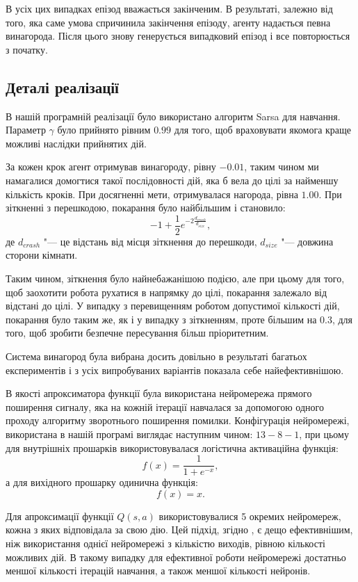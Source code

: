 \documentclass[a4paper,10pt,fleqn]{article}
\begin{document}
В усіх цих випадках епізод вважається закінченим. В результаті, залежно від того, яка саме умова спричинила закінчення епізоду, агенту надається певна винагорода. Після цього знову генерується випадковий епізод і все повторюється з початку.

\subsection{Деталі реалізації}

В нашій програмній реалізації було використано алгоритм Sarsa для навчання. Параметр $\gamma$ було прийнято рівним $0.99$ для того, щоб враховувати якомога краще можливі наслідки прийнятих дій.

За кожен крок агент отримував винагороду, рівну $-0.01$, таким чином ми намагалися домогтися такої послідовності дій, яка б вела до цілі за найменшу кількість кроків. При досягненні мети, отримувалася нагорода, рівна $1.00$. При зіткненні з перешкодою, покарання було найбільшим і становило:
\[
    -1+ \frac{1}{2} e^{-2\frac{d_{crash}}{d_{size}}},
\]
де $d_{crash}$ "--- це відстань від місця зіткнення до перешкоди, $d_{size}$ "--- довжина сторони кімнати.

Таким чином, зіткнення було найнебажанішою подією, але при цьому для того, щоб заохотити робота рухатися в напрямку до цілі, покарання залежало від відстані до цілі. У випадку з перевищенням роботом допустимої кількості дій, покарання було таким же, як і у випадку з зіткненням, проте більшим на $0.3$, для того, щоб зробити безпечне пересування більш пріоритетним.

Система винагород була вибрана досить довільно в результаті багатьох експериментів і з усіх випробуваних варіантів показала себе найефективнішою.

В якості апроксиматора функції була використана нейромережа прямого поширення сигналу, яка на кожній ітерації навчалася за допомогою одного проходу алгоритму зворотнього поширення помилки. Конфігурація нейромережі, використана в нашій програмі виглядає наступним чином: $13-8-1$, при цьому для внутрішніх прошарків використовувалася логістична активаційна функція:
\[
    f(x) = \frac{1}{1 + e^{-x}},
\]
а для вихідного прошарку одинична функція:
\[
    f(x) = x.
\]

Для апроксимації функції $Q(s,a)$ використовувалися 5 окремих нейромереж, кожна з яких відповідала за свою дію. Цей підхід, згідно \cite{Rummery1995}, є дещо ефективнішим, ніж використання однієї нейромережі з кількістю виходів, рівною кількості можливих дій. В такому випадку для ефективної роботи нейромережі достатньо меншої кількості ітерацій навчання, а також меншої кількості нейронів.
\end{document}
